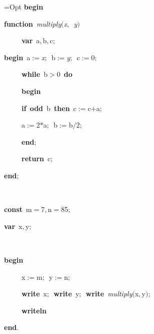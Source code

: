 
\fboxsep=Opt
\def\insert#1{$\fbox{#1}$}
\def\delete#1{$\fboxrule=.5mm\fbox{#1}$}
\rm
{\bf begin}\ \par
{\bf function}\ {\it multiply}$(${\sl x}$,$\ {\sl y}$)$\ \par
\ \ \ \ \ {\bf var}\ a$,$b$,$c$;$\ \par
{\bf begin}\ a$:=${\sl x}$;$\ b$:=${\sl y}$;$\ c$:=$0$;$\ \par
\ \ \ \ \ {\bf while}\ b$>$0\ {\bf do}\ \par
\ \ \ \ \ {\bf begin}\ \par
\ \ \ \ \ {\bf if}\ {\bf odd}\ b\ {\bf then}\ c$:=$c$+$a$;$\ \par
\ \ \ \ \ a$:=$2$*$a$;$\ b$:=$b$/$2$;$\ \par
\ \ \ \ \ {\bf end}$;$\ \par
\ \ \ \ \ {\bf return}\ c$;$\ \par
{\bf end}$;$\ \par
\ \par
{\bf const}\ {\sf m}$=$7$,${\sf n}$=$85$;$\ \par
{\bf var}\ x$,$y$;$\ \par
\ \par
{\bf begin}\ \par
\ \ \ \ \ x$:=${\sf m}$;$\ y$:=${\sf n}$;$\ \par
\ \ \ \ \ {\bf write}\ x$;$\ {\bf write}\ y$;$\ {\bf write}\ {\it multiply}$($x$,$y$)$$;$\ \par
\ \ \ \ \ {\bf writeln}\ \par
{\bf end}$.$

